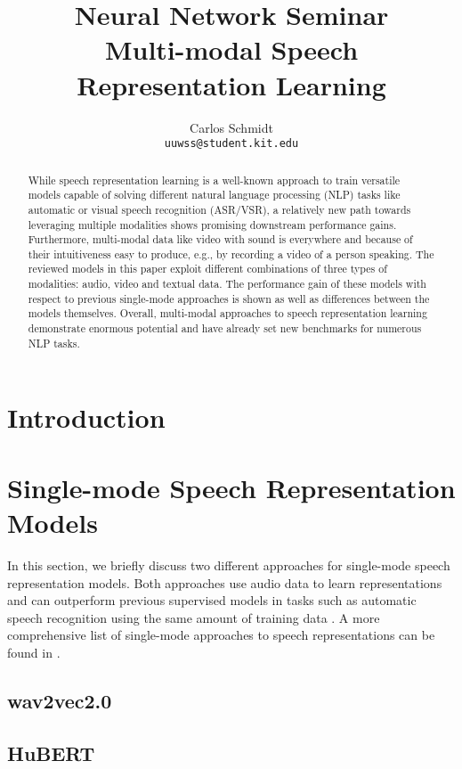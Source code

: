 \documentclass[11pt]{article}
\title{Neural Network Seminar\\Multi-modal Speech Representation Learning}
\author{Carlos Schmidt \\\texttt{uuwss@student.kit.edu}\\}
\begin{document}
\maketitle
\begin{abstract}
While speech representation learning is a well-known approach to train versatile models capable of solving different natural language processing (NLP) tasks like automatic or visual speech recognition (ASR/VSR), a relatively new path towards leveraging multiple modalities shows promising downstream performance gains. Furthermore, multi-modal data like video with sound is everywhere and because of their intuitiveness easy to produce, e.g., by recording a video of a person speaking. The reviewed models in this paper exploit different combinations of three types of modalities: audio, video and textual data. The performance gain of these models with respect to previous single-mode approaches is shown as well as differences between the models themselves. Overall, multi-modal approaches to speech representation learning demonstrate enormous potential and have already set new benchmarks for numerous NLP tasks.
\end{abstract}

\section{Introduction}

\section{Single-mode Speech Representation Models}\label{sec:single-mode}
In this section, we briefly discuss two different approaches for single-mode speech representation models. Both approaches use audio data to learn representations and can outperform previous supervised models in tasks such as automatic speech recognition using the same amount of training data \cite{wav2vec20}. A more comprehensive list of single-mode approaches to speech representations can be found in \citealt{srl-review}.
\subsection{wav2vec2.0}

\subsection{HuBERT}\label{sec:HuBERT}

\end{document}
